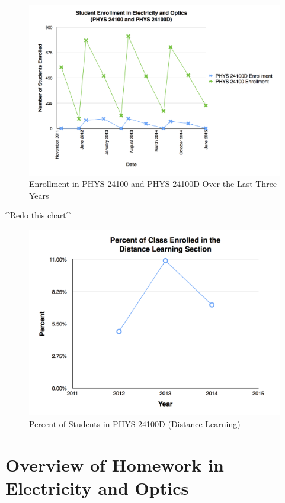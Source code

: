 \begin{figure}[!hb]
	\centering
	\includegraphics[width=5in]{img/chapter1/enrollment}
	\caption[Enrollment in PHYS 24100 and PHYS 24100D Over the Last Three Years]{Enrollment in PHYS 24100 and PHYS 24100D Over the Last Three Years}
	\label{fig:enrollment}
\end{figure}

^Redo this chart^

\begin{figure}[!hb]
	\centering
	\includegraphics[width=5in]{img/chapter1/percent}
	\caption[Percent of Students in PHYS 24100D (Distance Learning)]{Percent of Students in PHYS 24100D (Distance Learning)}
	\label{fig:percent}
\end{figure}

\section{Overview of Homework in Electricity and Optics}

